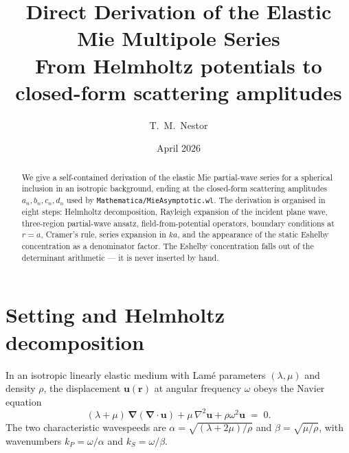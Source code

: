 \documentclass[11pt,a4paper]{article}
\title{Direct Derivation of the Elastic Mie Multipole Series\\
\large From Helmholtz potentials to closed-form scattering amplitudes}
\author{T.~M.~Nestor}
\date{April 2026}
\newcommand{\code}[1]{\texttt{#1}}
\newcommand{\bu}{\mathbf{u}}
\newcommand{\br}{\mathbf{r}}
\newcommand{\bnabla}{\boldsymbol{\nabla}}
\begin{document}
\maketitle

\begin{abstract}
We give a self-contained derivation of the elastic Mie partial-wave
series for a spherical inclusion in an isotropic background, ending at
the closed-form scattering amplitudes $a_n,b_n,c_n,d_n$ used by
\code{Mathematica/MieAsymptotic.wl}.  The derivation is organised in
eight steps: Helmholtz decomposition, Rayleigh expansion of the incident
plane wave, three-region partial-wave ansatz, field-from-potential
operators, boundary conditions at $r=a$, Cramer's rule, series expansion
in $ka$, and the appearance of the static Eshelby concentration as a
denominator factor.  The Eshelby concentration falls out of the
determinant arithmetic --- it is never inserted by hand.
\end{abstract}

\tableofcontents

\section{Setting and Helmholtz decomposition}

In an isotropic linearly elastic medium with Lam\'e parameters
$(\lambda,\mu)$ and density $\rho$, the displacement $\bu(\br)$ at
angular frequency $\omega$ obeys the Navier equation
\begin{equation}
(\lambda+\mu)\,\bnabla(\bnabla\!\cdot\!\bu) + \mu\,\nabla^2\bu + \rho\omega^2\bu \;=\; 0.
\label{eq:navier}
\end{equation}
The two characteristic wavespeeds are
$\alpha=\sqrt{(\lambda+2\mu)/\rho}$ and $\beta=\sqrt{\mu/\rho}$, with
wavenumbers $k_P=\omega/\alpha$ and $k_S=\omega/\beta$.
\end{document}
